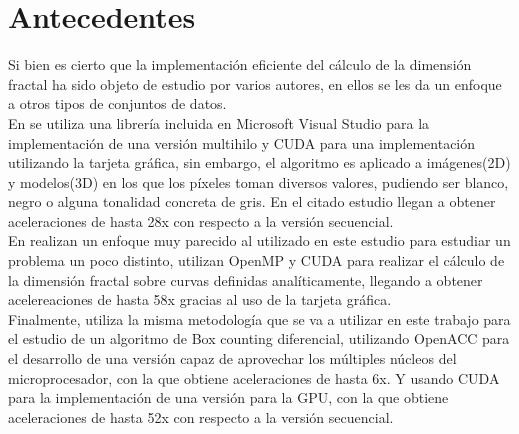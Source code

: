\chapter{Antecedentes}

Si bien es cierto que la implementación eficiente del cálculo de la dimensión fractal ha sido objeto de estudio por varios autores, en ellos se les da un enfoque a otros tipos de conjuntos de datos.\\ En \cite{JIMENEZ20121229} se utiliza una librería incluida en Microsoft Visual Studio para la implementación de una versión multihilo y CUDA para una implementación utilizando la tarjeta gráfica, sin embargo, el algoritmo es aplicado a imágenes(2D) y modelos(3D) en los que los píxeles toman diversos valores, pudiendo ser blanco, negro o alguna tonalidad concreta de gris. En el citado estudio llegan a obtener aceleraciones de hasta 28x con respecto a la versión secuencial. 
\\
En \cite{10.1007/978-3-030-64616-5_8} realizan un enfoque muy parecido al utilizado en este estudio para estudiar un problema un poco distinto, utilizan OpenMP y CUDA para realizar el cálculo de la dimensión fractal sobre curvas definidas analíticamente, llegando a obtener acelereaciones de hasta 58x gracias al uso de la tarjeta gráfica.
\\
Finalmente, \cite{de2020fast} utiliza la misma metodología que se va a utilizar en este trabajo para el estudio de un algoritmo de Box counting diferencial, utilizando OpenACC para el desarrollo de una versión capaz de aprovechar los múltiples núcleos del microprocesador, con la que obtiene aceleraciones de hasta 6x. Y usando CUDA para la implementación de una versión para la GPU, con la que obtiene aceleraciones de hasta 52x con respecto a la versión secuencial.